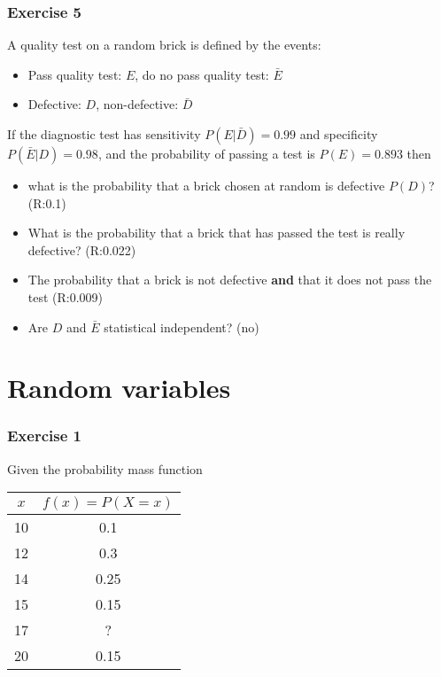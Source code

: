 \documentclass[
]{book}
\providecommand{\tightlist}{%
  \setlength{\itemsep}{0pt}\setlength{\parskip}{0pt}}
\begin{document}
\hypertarget{exercise-5}{%
\subsubsection{Exercise 5}\label{exercise-5}}

A quality test on a random brick is defined by the events:

\begin{itemize}
\tightlist
\item
  Pass quality test: \(E\), do no pass quality test: \(\bar{E}\)
\item
  Defective: \(D\), non-defective: \(\bar{D}\)
\end{itemize}

If the diagnostic test has sensitivity \(P(E|\bar{D})=0.99\) and specificity \(P(\bar{E}|D)=0.98\), and the probability of passing a test is \(P(E)=0.893\) then

\begin{itemize}
\item
  what is the probability that a brick chosen at random is defective \(P(D)\)? (R:0.1)
\item
  What is the probability that a brick that has passed the test is really defective? (R:0.022)
\item
  The probability that a brick is not defective \textbf{and} that it does not pass the test (R:0.009)
\item
  Are \(D\) and \(\bar{E}\) statistical independent? (no)
\end{itemize}

\hypertarget{random-variables}{%
\section{Random variables}\label{random-variables}}

\hypertarget{exercise-1-3}{%
\subsubsection{Exercise 1}\label{exercise-1-3}}

Given the probability mass function

\begin{longtable}[]{@{}cc@{}}
\toprule
\(x\) & \(f(x)=P(X=x)\) \\
\midrule
\endhead
10 & 0.1 \\
12 & 0.3 \\
14 & 0.25 \\
15 & 0.15 \\
17 & ? \\
20 & 0.15 \\
\bottomrule
\end{longtable}
\end{document}

